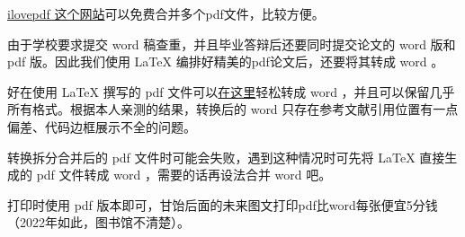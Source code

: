 \href{https://www.ilovepdf.com/zh-cn/merge_pdf}{ilovepdf 这个网站}可以免费合并多个pdf文件，比较方便。

由于学校要求提交 word 稿查重，并且毕业答辩后还要同时提交论文的 word 版和 pdf 版。因此我们使用 \LaTeX{} 编排好精美的pdf论文后，还要将其转成 word 。

好在使用 \LaTeX{} 撰写的 pdf 文件可以\href{https://www.pdfwordconvert.com/zh/convertform}{在这里}轻松转成 word ，并且可以保留几乎所有格式。根据本人亲测的结果，转换后的 word 只存在参考文献引用位置有一点偏差、代码边框展示不全的问题。

转换拆分合并后的 pdf 文件时可能会失败，遇到这种情况时可先将 \LaTeX{} 直接生成的 pdf 文件转成 word ，需要的话再设法合并 word 吧。

打印时使用 pdf 版本即可，甘饴后面的未来图文打印pdf比word每张便宜5分钱（2022年如此，图书馆不清楚）。


\label{chap:模板使用说明:end}

\let\filename\undefined
\let\hltext\undefined